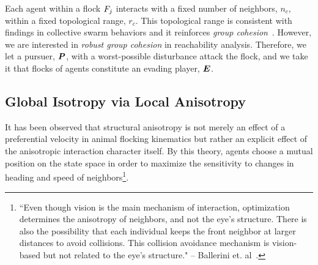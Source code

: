 Each agent within a flock $F_j$ interacts with a fixed number of neighbors, $n_c$, within a fixed topological range, $r_c$. This topological range %
is consistent with findings in collective swarm behaviors and it reinforces \textit{group cohesion}~\cite{Ballerini1232}. However, we are interested in \textit{robust group cohesion} in reachability analysis. Therefore, we let a pursuer, $\bm{P}$, with a worst-possible disturbance attack the flock, and we take it that flocks of agents constitute an evading player, $\bm{E}$. 

\subsection{Global Isotropy via Local Anisotropy}
%
It has been observed that structural anisotropy is not merely an effect of a preferential velocity in animal flocking kinematics but rather an explicit effect of the anisotropic interaction character itself. By this theory, agents choose a mutual position on the state space in order to maximize the sensitivity to changes in heading and speed of neighbors\footnote{``Even though vision is the main mechanism of interaction, optimization determines the anisotropy of neighbors, and not the eye's structure. There is also the possibility that each individual keeps the front neighbor at larger distances to avoid collisions. This collision avoidance mechanism is vision-based but not related to the eye's structure." -- Ballerini et. al~\cite{Ballerini1232}.}.
 
